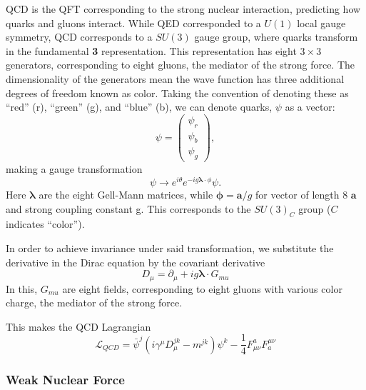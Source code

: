         \gls{QCD} is the \gls{QFT} corresponding to the strong nuclear interaction, predicting how quarks and gluons interact. While \gls{QED} corresponded to a $U(1)$ local gauge symmetry, \gls{QCD} corresponds to a $SU(3)$ gauge group, where quarks transform in the fundamental {\bf 3} representation. This representation has eight $3 \times 3$ generators, corresponding to eight gluons, the mediator of the strong force. The dimensionality of the generators mean the wave function has three additional degrees of freedom known as color. Taking the convention of denoting these as ``red'' (r), ``green'' (g), and ``blue'' (b), we can denote quarks, $\psi$ as a vector:
        \begin{equation}
            \psi =\begin{pmatrix} \psi_{r} \\ \psi_{b} \\ \psi_{g}\end{pmatrix},
        \end{equation}
        making a gauge transformation
        \begin{equation}
        \psi \rightarrow e^{i\theta}e^{-ig {\boldsymbol \lambda\cdot \phi}}\psi.
        \end{equation}
        Here $\boldsymbol \lambda$ are the eight Gell-Mann matrices, while ${\boldsymbol \phi} = {\boldsymbol a}/g$ for vector of length 8 $\boldsymbol a$ and strong coupling constant g. This corresponds to the $SU(3)_C$ group ($C$ indicates ``color'').

        In order to achieve invariance under said transformation, we substitute the derivative in the Dirac equation by the covariant derivative 
        \begin{equation}
            D_{\mu} = \partial_{\mu} + ig {\boldsymbol \lambda\cdot G_{mu}}
        \end{equation}
        In this, ${G_{mu}}$ are eight fields, corresponding to eight gluons with various color charge, the mediator of the strong force.

        This makes the \gls{QCD} Lagrangian
        \begin{equation}
            \mathcal{L}_{QCD} = \bar{\psi}^j (i \gamma^{\mu} D_{\mu}^{jk} - m^{jk})\psi^{k} - \frac{1}{4} F_{\mu \nu}^{a} F^{\mu \nu}_{a}
        \end{equation}


        \subsubsection{Weak Nuclear Force}

